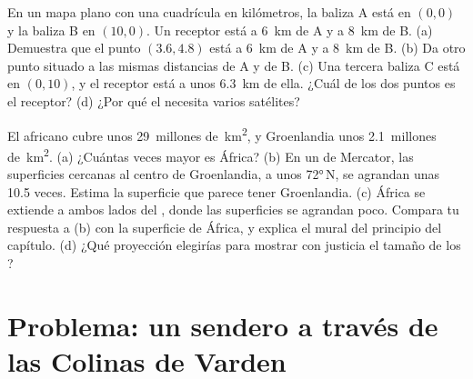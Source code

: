 \begin{exercise}[$\star\star\star$]\label{exo:g9:maps-of-the-earth:11}
En un mapa plano con una cuadrícula en kilómetros, la baliza A está en
$(0, 0)$ y la baliza B en $(10, 0)$. Un receptor está a \qty{6}{km} de A y
a \qty{8}{km} de B. (a) Demuestra que el punto $(3.6, 4.8)$ está a
\qty{6}{km} de A y a \qty{8}{km} de B. (b) Da otro punto situado a las
mismas distancias de A y de B. (c) Una tercera baliza C está en $(0, 10)$,
y el receptor está a unos \qty{6.3}{km} de ella. ¿Cuál de los dos puntos
es el receptor? (d) ¿Por qué el  necesita
varios satélites?
\end{exercise}

\begin{exercise}[$\star\star\star$]\label{exo:g9:maps-of-the-earth:12}
El  africano cubre unos 29~millones de~\unit{km^2}, y
Groenlandia unos 2.1~millones de~\unit{km^2}. (a) ¿Cuántas veces mayor es
África? (b) En un  de Mercator, las superficies cercanas al centro de
Groenlandia, a unos \ang{72}\,N, se agrandan unas 10.5 veces. Estima la
superficie que parece tener Groenlandia. (c) África se extiende a ambos
lados del , donde las superficies se agrandan poco. Compara tu
respuesta a (b) con la superficie de África, y explica el  mural del
principio del capítulo. (d) ¿Qué proyección elegirías para mostrar con
justicia el tamaño de los ?
\end{exercise}

\section{Problema: un sendero a través de las Colinas de Varden}

